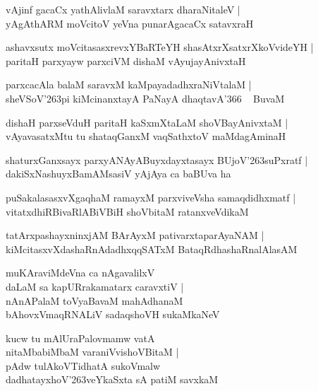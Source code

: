 \documentclass[twoside,12pt,openright]{book}
\def\S{\char'263}
\newcounter{shloka}[chapter]
\begin{document}
\begin{shloka}%
vAjinf gacaCx yathAlivlaM saravxtarx dharaNitaleV |\\
yAgAthARM moVcitoV yeVna punarAgacaCx satavxraH 
\end{shloka}

\begin{shloka}%
ashavxsutx moVcitasasxrevxYBaRTeYH shasAtxrXsatxrXkoVvideYH |\\
paritaH parxyayw parxciVM  dishaM vAyujayAnivxtaH
\end{shloka}

\begin{shloka}%
parxcacAla balaM saravxM kaMpayadadhxraNiVtalaM |\\
sheVSoV\S pi kiMcinanxtayA PaNayA dhaqtavA\char'366 ~ BuvaM 
\end{shloka}

\begin{shloka}%
dishaH parxseVduH paritaH kaSxmXtaLaM shoVBayAnivxtaM |\\
vAyavasatxMtu tu shataqGanxM vaqSathxtoV maMdagAminaH
\end{shloka}

\begin{shloka}%
shaturxGanxsayx parxyANAyABuyxdayxtasayx BUjoV\S suPxratf |\\
dakiSxNashuyxBamAMsasiV yAjAya ca baBUva ha 
\end{shloka}

\begin{shloka}%
puSakalasasxvXgaqhaM ramayxM parxviveVsha samaqdidhxmatf |\\
vitatxdhiRBivaRlABiVBiH shoVbitaM ratanxveVdikaM 
\end{shloka}

\begin{shloka}%
tatArxpashayxninxjAM BArAyxM pativarxtaparAyaNAM |\\
kiMcitasxvXdashaRnAdadhxqqSATxM BataqRdhashaRnalAlasAM 
\end{shloka}

\begin{shloka}%
muKAraviMdeVna ca nAgavalilxV\\
daLaM sa kapURrakamatarx caravxtiV |\\
nAnAPalaM toVyaBavaM mahAdhanaM \\
bAhovxVmaqRNALiV sadaqshoVH sukaMkaNeV  
\end{shloka}

\begin{shloka}%
kucw tu mAlUraPalovmamw vatA \\
nitaMbabiMbaM varaniVvishoVBitaM |\\
pAdw tulAkoVTidhatA sukoVmalw \\
dadhatayxhoV\S veYkaSxta sA patiM savxkaM
\end{shloka}
\end{document}
